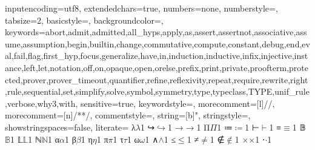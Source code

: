 
{
  inputencoding=utf8,
  extendedchars=true,
  numbers=none,
  numberstyle={},
  tabsize=2,
  basicstyle={\ttfamily\small\upshape},
  backgroundcolor=\color{lightgrey},
  keywords={abort,admit,admitted,all_hyps,apply,as,assert,assertnot,associative,assume,assumption,begin,builtin,change,commutative,compute,constant,debug,end,eval,fail,flag,first_hyp,focus,generalize,have,in,induction,inductive,infix,injective,instance,left,let,notation,off,on,opaque,open,orelse,prefix,print,private,proofterm,protected,prover,prover_timeout,quantifier,refine,reflexivity,repeat,require,rewrite,right,rule,sequential,set,simplify,solve,symbol,symmetry,type,typeclass,TYPE,unif_rule,verbose,why3,with},
  sensitive=true,
  keywordstyle=\color{blue},
  morecomment=[l]{//},
  morecomment=[n]{/*}{*/},
  commentstyle={\itshape\color{red}},
  string=[b]{"},
  stringstyle=\color{orange},
  showstringspaces=false,
  literate=
  {λ}{$\lambda$}1
  {↪}{$\hookrightarrow$}1
  {→}{$\rightarrow$}1
  {Π}{$\Pi$}1
  {≔}{$\coloneqq$}1
  {⊢}{$\vdash$}1
  {≡}{$\equiv$}1
  {𝔹}{$\mathbb{B}$}1
  {𝕃}{$\mathbb{L}$}1
  {ℕ}{$\mathbb{N}$}1
  {α}{$\alpha$}1
  {β}{$\beta$}1
  {η}{$\eta$}1
  {π}{$\pi$}1
  {τ}{$\tau$}1
  {ω}{$\omega$}1
  {∧}{$\wedge$}1
  {≤}{$\le$}1
  {≠}{$\neq$}1
  {∉}{$\notin$}1
  {×}{$\times$}1
  {⋅}{$\cdot$}1
}
